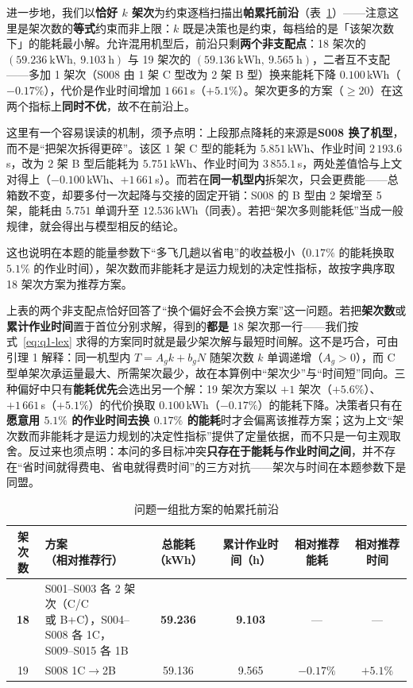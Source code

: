 进一步地，我们以\textbf{恰好 $k$ 架次}为约束逐档扫描出\textbf{帕累托前沿}（表~\ref{tab:q1-pareto}）——注意这里是架次数的\textbf{等式}约束而非上限：$k$ 既是决策也是约束，每档给的是「该架次数下」的能耗最小解。允许混用机型后，前沿只剩\textbf{两个非支配点}：18 架次的 $(59.236\ \text{kWh},\ 9.103\ \text{h})$ 与 19 架次的 $(59.136\ \text{kWh},\ 9.565\ \text{h})$，二者互不支配——多加 1 架次（S008 由 1 架 C 型改为 2 架 B 型）换来能耗下降 $0.100$\,kWh（$-0.17\%$），代价是作业时间增加 $1\,661$\,s（$+5.1\%$）。架次更多的方案（$\ge 20$）在这两个指标上\textbf{同时不优}，故不在前沿上。

这里有一个容易误读的机制，须予点明：上段那点降耗的来源是\textbf{S008 换了机型}，而不是“把架次拆得更碎”。该区 1 架 C 型的能耗为 $5.851$\,kWh、作业时间 $2\,193.6$\,s，改为 2 架 B 型后能耗为 $5.751$\,kWh、作业时间为 $3\,855.1$\,s，两处差值恰与上文对得上（$-0.100$\,kWh、$+1\,661$\,s）。而若在\textbf{同一机型内}拆架次，只会更费能——总箱数不变，却要多付一次起降与交接的固定开销：S008 的 B 型由 2 架增至 5 架，能耗由 $5.751$ 单调升至 $12.536$\,kWh（同表）。若把“架次多则能耗低”当成一般规律，就会得出与模型相反的结论。

这也说明在本题的能量参数下“多飞几趟以省电”的收益极小（$0.17\%$ 的能耗换取 $5.1\%$ 的作业时间），架次数而非能耗才是运力规划的决定性指标，故按字典序取 18 架次方案为推荐方案。

上表的两个非支配点恰好回答了“换个偏好会不会换方案”这一问题。若把\textbf{架次数}或\textbf{累计作业时间}置于首位分别求解，得到的\textbf{都是} 18 架次那一行——我们按式~\eqref{eq:q1-lex} 求得的方案同时就是最少架次解与最短时间解。这不是巧合，可由引理 1 解释：同一机型内 $T=A_g k+b_g N$ 随架次数 $k$ 单调递增（$A_g>0$），而 C 型单架次承运量最大、所需架次最少，故在本算例中“架次少”与“时间短”同向。三种偏好中只有\textbf{能耗优先}会选出另一个解：19 架次方案以 $+1$ 架次（$+5.6\%$）、$+1\,661$\,s（$+5.1\%$）的代价换取 $0.100$\,kWh（$-0.17\%$）的能耗下降。决策者只有在\textbf{愿意用 $5.1\%$ 的作业时间去换 $0.17\%$ 的能耗}时才会偏离该推荐方案；这为上文“架次数而非能耗才是运力规划的决定性指标”提供了定量依据，而不只是一句主观取舍。反过来也须点明：本问的多目标冲突\textbf{只存在于能耗与作业时间之间}，并不存在“省时间就得费电、省电就得费时间”的三方对抗——架次与时间在本题参数下是同盟。

\begin{table}[htbp]
	\caption{问题一组批方案的帕累托前沿}
	\label{tab:q1-pareto}
	\centering
	\footnotesize
	\setlength{\tabcolsep}{3pt}
	\begin{tabular}{clcccc}
		\toprule
		架次数 & \shortstack{方案\\（相对推荐行）} & 总能耗（kWh） & 累计作业时间（h） & 相对推荐能耗 & 相对推荐时间 \\
		\midrule
		\textbf{18} & \shortstack[l]{S001--S003 各 2 架次（C/C\\或 B+C），S004--S008 各 1C，\\S009--S015 各 1B} & \textbf{59.236} & \textbf{9.103} & --- & --- \\
		19 & S008 1C$\to$2B & 59.136 & 9.565 & $-0.17\%$ & $+5.1\%$ \\
		\bottomrule
	\end{tabular}
\end{table}

